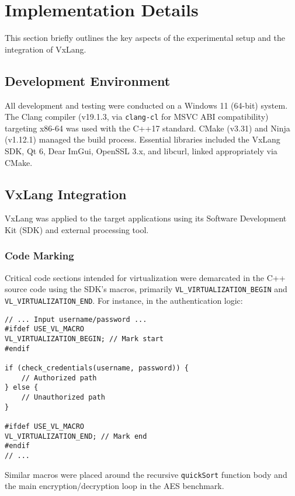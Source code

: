 \section{Implementation Details} \label{sec:implementation}
This section briefly outlines the key aspects of the experimental setup and the integration of VxLang.

\subsection{Development Environment}
All development and testing were conducted on a Windows 11 (64-bit) system. The Clang compiler (v19.1.3, via \texttt{clang-cl} for MSVC ABI compatibility) targeting x86-64 was used with the C++17 standard. CMake (v3.31) and Ninja (v1.12.1) managed the build process. Essential libraries included the VxLang SDK, Qt 6, Dear ImGui, OpenSSL 3.x, and libcurl, linked appropriately via CMake.

\subsection{VxLang Integration}
VxLang was applied to the target applications using its Software Development Kit (SDK) and external processing tool.

\subsubsection{Code Marking} Critical code sections intended for virtualization were demarcated in the C++ source code using the SDK's macros, primarily \texttt{VL\_VIRTUALIZATION\_BEGIN} and \texttt{VL\_VIRTUALIZATION\_END}. For instance, in the authentication logic:

\begin{verbatim}
// ... Input username/password ...
#ifdef USE_VL_MACRO
VL_VIRTUALIZATION_BEGIN; // Mark start
#endif

if (check_credentials(username, password)) {
    // Authorized path
} else {
    // Unauthorized path
}

#ifdef USE_VL_MACRO
VL_VIRTUALIZATION_END; // Mark end
#endif
// ...
\end{verbatim}
Similar macros were placed around the recursive \texttt{quickSort} function body and the main encryption/decryption loop in the AES benchmark.

